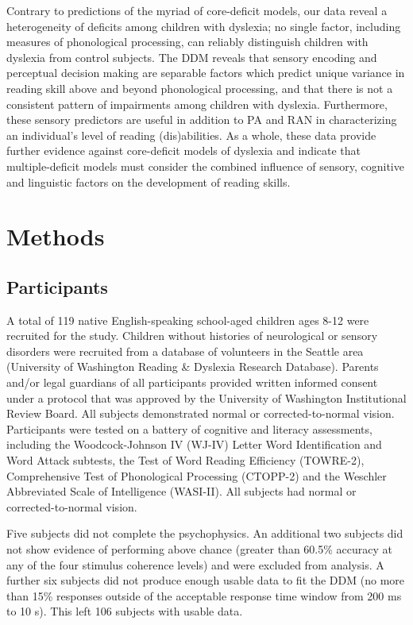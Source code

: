 \documentclass[../uwthesis.tex]{subfiles}
\begin{document}
Contrary to predictions of the myriad of core-deficit models, our data reveal a heterogeneity of deficits among children with dyslexia; no single factor, including measures of phonological processing, can reliably distinguish children with dyslexia from control subjects. The DDM reveals that sensory encoding and perceptual decision making are separable factors which predict unique variance in reading skill above and beyond phonological processing, and that there is not a consistent pattern of impairments among children with dyslexia. Furthermore, these sensory predictors are useful in addition to PA and RAN in characterizing an individual’s level of reading (dis)abilities. As a whole, these data provide further evidence against core-deficit models of dyslexia and indicate that multiple-deficit models must consider the combined influence of sensory, cognitive and linguistic factors on the development of reading skills. 

\section{Methods}

\subsection{Participants}
A total of 119 native English-speaking school-aged children ages 8-12 were recruited for the study. Children without histories of neurological or sensory disorders were recruited from a database of volunteers in the Seattle area (University of Washington Reading \& Dyslexia Research Database). Parents and/or legal guardians of all participants provided written informed consent under a protocol that was approved by the University of Washington Institutional Review Board. All subjects demonstrated normal or corrected-to-normal vision. Participants were tested on a battery of cognitive and literacy assessments, including the Woodcock-Johnson IV (WJ-IV) Letter Word Identification and Word Attack subtests, the Test of Word Reading Efficiency (TOWRE-2), Comprehensive Test of Phonological Processing (CTOPP-2) and the Weschler Abbreviated Scale of Intelligence (WASI-II). All subjects had normal or corrected-to-normal vision.

Five subjects did not complete the psychophysics. An additional two subjects did not show evidence of performing above chance (greater than 60.5\% accuracy at any of the four stimulus coherence levels) and were excluded from analysis. A further six subjects did not produce enough usable data to fit the DDM (no more than 15\% responses outside of the acceptable response time window from 200 ms to 10 s). This left 106 subjects with usable data.
\end{document}
